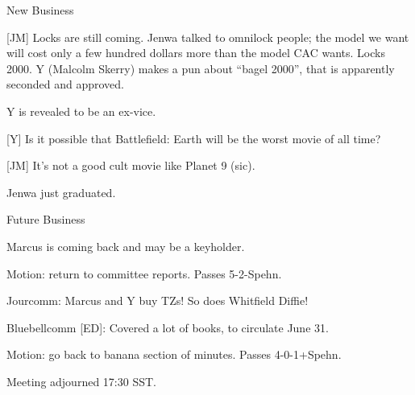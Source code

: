 \documentclass[12pt]{article}
\begin{document}
\centerline{New Business}

[JM] Locks are still coming.  Jenwa talked to omnilock people; the model
we want will cost only a few hundred dollars more than the model CAC wants.
Locks 2000.  Y (Malcolm Skerry) makes a pun about ``bagel 2000'', that is
apparently seconded and approved.

Y is revealed to be an ex-vice.

[Y] Is it possible that Battlefield: Earth will be the worst movie of all time?

[JM] It's not a good cult movie like Planet 9 (sic).

Jenwa just graduated.

\vskip 12pt

\centerline{Future Business}

Marcus is coming back and may be a keyholder.

Motion: return to committee reports.  Passes 5-2-Spehn.

Jourcomm: Marcus and Y buy TZs!  So does Whitfield Diffie!

Bluebellcomm [ED]: Covered a lot of books, to circulate June 31.

Motion: go back to banana section of minutes.  Passes 4-0-1+Spehn.

Meeting adjourned 17:30 SST.
\end{document}
